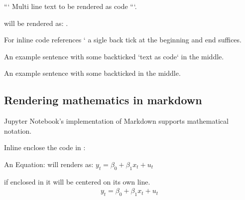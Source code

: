 \documentclass[letterpaper,10pt,english]{jupyterBook}
\begin{document}
\sphinxAtStartPar
```
Multi line
text to be rendered as code
```.

\sphinxAtStartPar
will be rendered as: .

\begin{sphinxVerbatim}[commandchars=\\\{\}]

  
      
\end{sphinxVerbatim}

\sphinxAtStartPar
For inline code references ‘ a sigle back tick at the beginning and end suffices.

\sphinxAtStartPar
{}

\sphinxAtStartPar
An example sentence with some back\sphinxhyphen{}ticked `text as code` in the middle.

\sphinxAtStartPar
{}

\sphinxAtStartPar
An example sentence with some back\sphinxhyphen{}ticked  in the middle.


\subsection{Rendering mathematics in markdown}
\label{\detokenize{content/04_PythonEssentials/Intro_Jupyter_notebook:rendering-mathematics-in-markdown}}
\sphinxAtStartPar
Jupyter Notebook’s implementation of Markdown supports  mathematical notation.

\sphinxAtStartPar
Inline enclose the  code in \sphinxcode{\sphinxupquote{\$}}:

\sphinxAtStartPar
An Equation:  will renders as: \(y_t = \beta_0 + \beta_1 x_t + u_t\)

\sphinxAtStartPar
if enclosed in \sphinxcode{\sphinxupquote{\$\$}} \sphinxcode{\sphinxupquote{\$\$}} it will be centered on its own line.
\begin{equation*}
\begin{split}y_t = \beta_0 + \beta_1 x_t + u_t\end{split}
\end{equation*}
\end{document}
